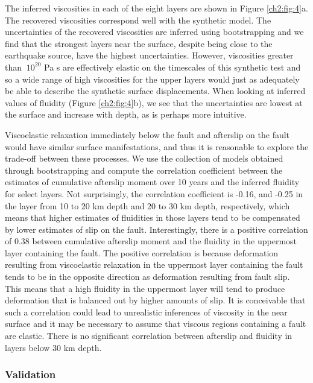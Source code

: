 The inferred viscosities in each of the eight layers are shown in
Figure \ref{ch2:fig:4}a.  The recovered viscosities correspond well
with the synthetic model.  The uncertainties of the recovered
viscosities are inferred using bootstrapping and we find that the
strongest layers near the surface, despite being close to the
earthquake source, have the highest uncertainties.  However,
viscosities greater than $~10^{20}$ Pa s are effectively elastic on
the timescales of this synthetic test and so a wide range of high
viscosities for the upper layers would just as adequately be able to
describe the synthetic surface displacements.  When looking at
inferred values of fluidity (Figure \ref{ch2:fig:4}b), we see that the
uncertainties are lowest at the surface and increase with depth, as is
perhaps more intuitive.

Viscoelastic relaxation immediately below the fault and afterslip on
the fault would have similar surface manifestations, and thus it is
reasonable to explore the trade-off between these processes.  We use
the collection of models obtained through bootstrapping and compute
the correlation coefficient between the estimates of cumulative
afterslip moment over 10 years and the inferred fluidity for select
layers. Not surprisingly, the correlation coefficient is -0.16, and
-0.25 in the layer from 10 to 20 km depth and 20 to 30 km depth,
respectively, which means that higher estimates of fluidities in those
layers tend to be compensated by lower estimates of slip on the fault.
Interestingly, there is a positive correlation of 0.38 between
cumulative afterslip moment and the fluidity in the uppermost layer
containing the fault. The positive correlation is because deformation
resulting from viscoelastic relaxation in the uppermost layer
containing the fault tends to be in the opposite direction as
deformation resulting from fault slip. This means that a high fluidity
in the uppermost layer will tend to produce deformation that is
balanced out by higher amounts of slip.  It is conceivable that such a
correlation could lead to unrealistic inferences of viscosity in the
near surface and it may be necessary to assume that viscous regions
containing a fault are elastic.  There is no significant correlation
between afterslip and fluidity in layers below 30 km depth.

\subsubsection{Validation}\label{ch2:sec:Validation}


